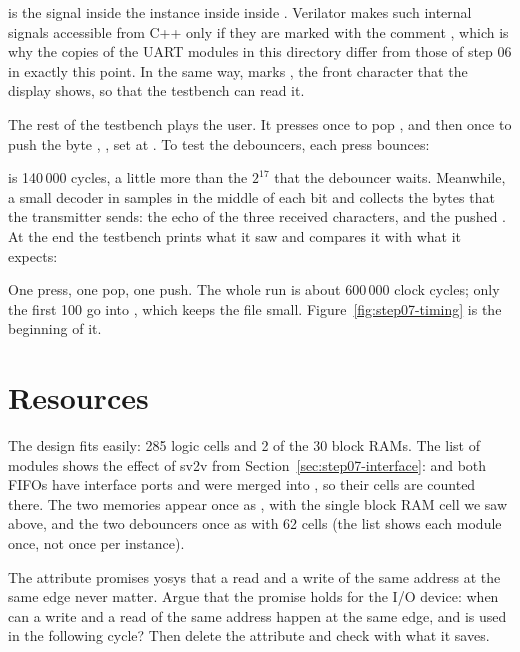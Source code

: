 
 is the signal  inside
the instance  inside  inside . Verilator makes
such internal signals accessible from C++ only if they are marked with the
comment , which is why the copies of the UART
modules in this directory differ from those of step 06 in exactly this point.
In the same way,  marks , the front character that the
display shows, so that the testbench can read it.

The rest of the testbench plays the user. It presses  once to pop
, and then  once to push the byte , , set
at . To test the debouncers, each press bounces:


 is 140\,000 cycles, a little more than the $2^{17}$ that the
debouncer waits. Meanwhile, a small decoder in  samples  in
the middle of each bit and collects the bytes that the transmitter sends: the
echo of the three received characters, and the pushed . At the end the
testbench prints what it saw and compares it with what it expects:


One press, one pop, one push. The whole run is about 600\,000 clock cycles;
only the first 100 go into , which keeps the file small.
Figure~\ref{fig:step07-timing} is the beginning of it.

\section{Resources}
\label{sec:step07-resources}


The design fits easily: 285 logic cells and 2 of the 30 block RAMs. The list
of modules shows the effect of sv2v from
Section~\ref{sec:step07-interface}:  and both FIFOs have interface
ports and were merged into , so their cells are counted there. The
two memories appear once as , with the single block RAM cell
we saw above, and the two debouncers once as  with 62 cells (the
list shows each module once, not once per instance).

\begin{exercise}
\label{ex:step07-rwcheck}
The attribute  promises yosys that a read and a write
of the same address at the same edge never matter. Argue that the promise
holds for the I/O device: when can a write and a read of the same address
happen at the same edge, and is  used in the following cycle?
Then delete the attribute and check with  what it saves.
\end{exercise}

